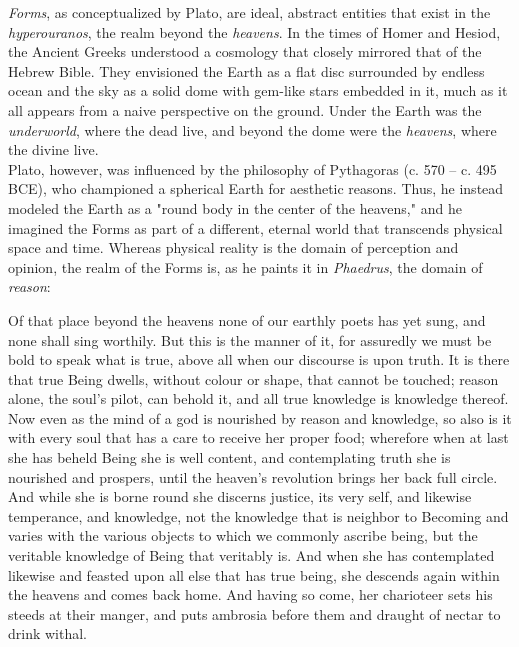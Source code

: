 \textit{Forms}, as conceptualized by Plato, are ideal, abstract entities that exist in the \textit{hyperouranos}, the realm beyond the \textit{heavens}. In the times of Homer and Hesiod, the Ancient Greeks understood a cosmology that closely mirrored that of the Hebrew Bible. They envisioned the Earth as a flat disc surrounded by endless ocean and the sky as a solid dome with gem-like stars embedded in it, much as it all appears from a naive perspective on the ground. Under the Earth was the \textit{underworld}, where the dead live, and beyond the dome were the \textit{heavens}, where the divine live. \\


Plato, however, was influenced by the philosophy of Pythagoras (c. 570 -- c. 495 BCE), who championed a spherical Earth for aesthetic reasons. Thus, he instead modeled the Earth as a "round body in the center of the heavens," and he imagined the Forms as part of a different, eternal world that transcends physical space and time. Whereas physical reality is the domain of perception and opinion, the realm of the Forms is, as he paints it in \textit{Phaedrus}, the domain of \textit{reason}: \\

\begin{displayquote}
	Of that place beyond the heavens none of our earthly poets has yet sung, and none shall sing worthily. But this is the manner of it, for assuredly we must be bold to speak what is true, above all when our discourse is upon truth. It is there that true Being dwells, without colour or shape, that cannot be touched; reason alone, the soul's pilot, can behold it, and all true knowledge is knowledge thereof. Now even as the mind of a god is nourished by reason and knowledge, so also is it with every soul that has a care to receive her proper food; wherefore when at last she has beheld Being she is well content, and contemplating truth she is nourished and prospers, until the heaven's revolution brings her back full circle. And while she is borne round she discerns justice, its very self, and likewise temperance, and knowledge, not the knowledge that is neighbor to Becoming and varies with the various objects to which we commonly ascribe being, but the veritable knowledge of Being that veritably is. And when she has contemplated likewise and feasted upon all else that has true being, she descends again within the heavens and comes back home. And having so come, her charioteer sets his steeds at their manger, and puts ambrosia before them and draught of nectar to drink withal. \\
\end{displayquote}

